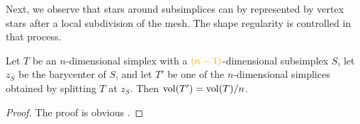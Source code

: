 \documentclass[10pt,letterpaper]{article}
\newcommand\cye[1]{%
  \protect\leavevmode
  \begingroup
    \color{red!35!yellow}%
    #1%
  \endgroup
}
\begin{document}



Next, we observe that stars around subsimplices can \cye{by} represented by vertex stars after a local subdivision of the mesh.
The shape regularity is controlled in that process. 

\begin{lemma}\label{lemma:stardivision}
    Let $T$ be an $n$-dimensional simplex with a $\cye{(n-1)}$-dimensional subsimplex $S$,
    let $z_S$ be the barycenter of $S$, 
    and let $T'$ be one of the $n$-dimensional simplices obtained by splitting $T$ at $z_{S}$.
    Then $\operatorname{vol}(T') = \operatorname{vol}(T) / n$. 
\end{lemma}
\begin{proof}
    \cye{The proof is obvious}.
\end{proof}

\end{document}
